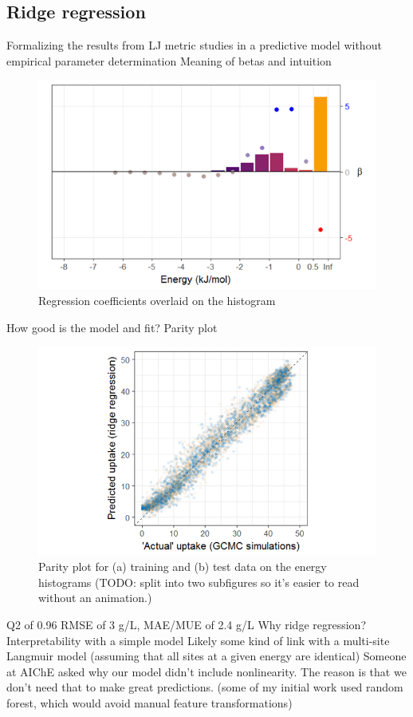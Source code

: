 \documentclass[letterpaper]{article}
\begin{document}
\subsection{Ridge regression}
\begin{outline}
	\1 Formalizing the results from LJ metric studies in a predictive model without empirical parameter determination
	\1 Meaning of betas and intuition
	\begin{figure}[H]
		\centering
		\includegraphics[width=0.75\columnwidth]{Figs/betas.png}
		\caption{Regression coefficients overlaid on the histogram}
		\label{fig:betas}
	\end{figure}
	\1 How good is the model and fit?
		\2 Parity plot
		\begin{figure}[H]
			\centering
			\includegraphics[width=0.75\columnwidth]{Figs/parity.png}
			\caption{Parity plot for (a) training and (b) test data on the energy histograms (TODO: split into two subfigures so it's easier to read without an animation.)}
			\label{fig:parity}
		\end{figure}
		\2 Q2 of 0.96
		\2 RMSE of 3 g/L, MAE/MUE of 2.4 g/L
	\1 Why ridge regression?
		\2 Interpretability with a simple model
		\2 Likely some kind of link with a multi-site Langmuir model (assuming that all sites at a given energy are identical)
		\2 Someone at AIChE asked why our model didn't include nonlinearity.  The reason is that we don't need that to make great predictions. (some of my initial work used random forest, which would avoid manual feature transformations)
\end{outline}
\end{document}
